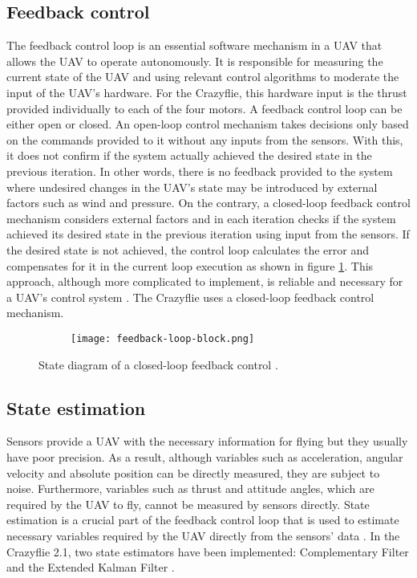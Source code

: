 \documentclass[10pt, a4paper]{article}
\begin{document}
    \subsection{Feedback control}
    \label{section:feedback-control}
    The feedback control loop is an essential software mechanism in a UAV that allows the UAV to operate autonomously. It is responsible for measuring the current state of the UAV and using relevant control algorithms to moderate the input of the UAV's hardware. For the Crazyflie, this hardware input is the thrust provided individually to each of the four motors. A feedback control loop can be either open or closed. An open-loop control mechanism takes decisions only based on the commands provided to it without any inputs from the sensors. With this, it does not confirm if the system actually achieved the desired state in the previous iteration. In other words, there is no feedback provided to the system where undesired changes in the UAV's state may be introduced by external factors such as wind and pressure. On the contrary, a closed-loop feedback control mechanism considers external factors and in each iteration checks if the system achieved its desired state in the previous iteration using input from the sensors. If the desired state is not achieved, the control loop calculates the error and compensates for it in the current loop execution as shown in figure \ref{figure:feedback-loop-block}. This approach, although more complicated to implement, is reliable and necessary for a UAV's control system \cite{report:feedback-control}. The Crazyflie uses a closed-loop feedback control mechanism.

    \begin{figure}[hbt!]
        \centering
        \begin{subfigure}[b]{0.78\textwidth}
            \centering
            \texttt{[image: feedback-loop-block.png]}
        \end{subfigure}
        \caption{State diagram of a closed-loop feedback control \cite{report:feedback-control}.}
        \label{figure:feedback-loop-block}
    \end{figure}

    \subsection{State estimation}
    \label{section:estimator}
    Sensors provide a UAV with the necessary information for flying but they usually have poor precision. As a result, although variables such as acceleration, angular velocity and absolute position can be directly measured, they are subject to noise. Furthermore, variables such as thrust and attitude angles, which are required by the UAV to fly, cannot be measured by sensors directly. State estimation is a crucial part of the feedback control loop that is used to estimate necessary variables required by the UAV directly from the sensors' data \cite{book:quan2017-state-estimators}. In the Crazyflie 2.1, two state estimators have been implemented: Complementary Filter and the Extended Kalman Filter \cite{web:stateEstimator/bitcraze}.
\end{document}

